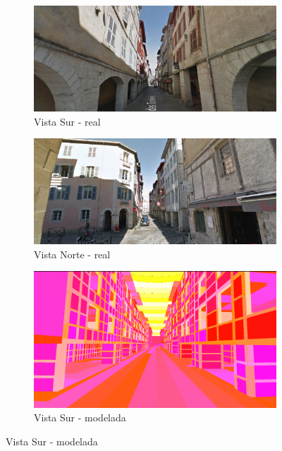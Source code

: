 \begin{figure}[H]
	\centering
	\begin{subfigure}{0.475\textwidth}
		\includegraphics[width=1\linewidth]{assets/streetreal1}
		\caption{Vista Sur - real}
	\end{subfigure}
	\begin{subfigure}{0.475\textwidth}
		\includegraphics[width=1\linewidth]{assets/streetreal2}
		\caption{Vista Norte - real}
	\end{subfigure}
	\begin{subfigure}{0.475\textwidth}
		\includegraphics[width=1\linewidth]{assets/streetmodel1}
		\caption{Vista Sur - modelada}
	\end{subfigure}

\end{figure}
